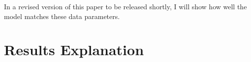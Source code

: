 \documentclass[letter, 12pt, epsf,leqno]{article}
\begin{document}
In a revised version of this paper to be released shortly, I will show how well the model matches these data parameters. %


\section{Results Explanation}\label{sec:results}


%
%
%
\end{document}
